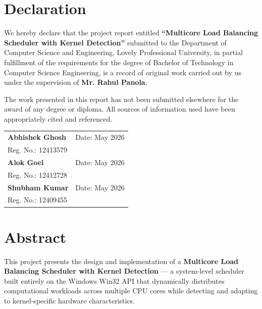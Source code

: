 \documentclass[12pt,a4paper]{article}
\begin{document}
\newpage
\thispagestyle{empty}
\section*{Declaration}

We hereby declare that the project report entitled \textbf{``Multicore Load Balancing Scheduler with Kernel Detection''} submitted to the Department of Computer Science and Engineering, Lovely Professional University, in partial fulfillment of the requirements for the degree of Bachelor of Technology in Computer Science Engineering, is a record of original work carried out by us under the supervision of \textbf{Mr. Rahul Panola}.

The work presented in this report has not been submitted elsewhere for the award of any degree or diploma. All sources of information used have been appropriately cited and referenced.

\vspace{2cm}

\noindent
\begin{tabular}{p{6cm} p{6cm}}
  \textbf{Abhishek Ghosh} & Date: May 2026 \\
  Reg. No.: 12413579 & \\[1.2cm]
  \textbf{Alok Goel} & Date: May 2026 \\
  Reg. No.: 12412728 & \\[1.2cm]
  \textbf{Shubham Kumar} & Date: May 2026 \\
  Reg. No.: 12409455 & \\
\end{tabular}

\newpage
\section*{Abstract}

This project presents the design and implementation of a \textbf{Multicore Load Balancing Scheduler with Kernel Detection} — a system-level scheduler built entirely on the Windows Win32 API that dynamically distributes computational workloads across multiple CPU cores while detecting and adapting to kernel-specific hardware characteristics.
\end{document}
